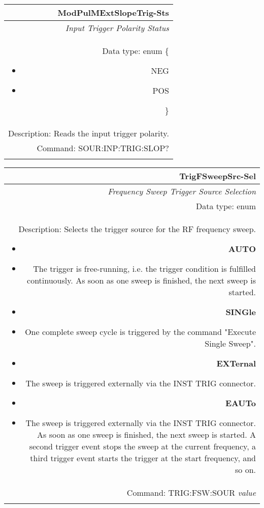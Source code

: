 \documentclass[openany]{article}
\begin{document}
		\begin{tabular}{N}
			\hline
			\bfseries ModPulMExtSlopeTrig-Sts \\ \hline
			\emph{Input Trigger Polarity Status} \\
			Data type: enum \{\begin{itemize}[noitemsep]
				\small
				\item[] NEG
				\item[] POS
			\end{itemize}\} \\ 
			Description: Reads the input trigger polarity. \\
			Command: SOUR:INP:TRIG:SLOP? \\
			\\

		\end{tabular}


		\begin{tabular}{N}
			\hline
			\bfseries TrigFSweepSrc-Sel \\ \hline
			\emph{Frequency Sweep Trigger Source Selection} \\
			Data type: enum \\   
			Description: Selects the trigger source for the RF frequency sweep.\begin{itemize}[noitemsep]
				\small
				\item[] \textbf{AUTO}
				\item[] The trigger is free-running, i.e. the trigger condition is fulfilled continuously. As soon as one sweep is finished, the next sweep is started.
                                \item[] \textbf{SINGle}
				\item[] One complete sweep cycle is triggered by the command "Execute Single Sweep".
				\item[] \textbf{EXTernal}
				\item[] The sweep is triggered externally via the INST TRIG connector.
                                \item[] \textbf{EAUTo}
				\item[] The sweep is triggered externally via the INST TRIG connector. As soon as one sweep is finished, the next sweep is started. A second trigger event stops the sweep at the current frequency, a third trigger event starts the trigger at the start frequency, and so on.

			\end{itemize} \\
			Command: TRIG:FSW:SOUR \emph{value} \\
			\\

		\end{tabular}
\end{document}
